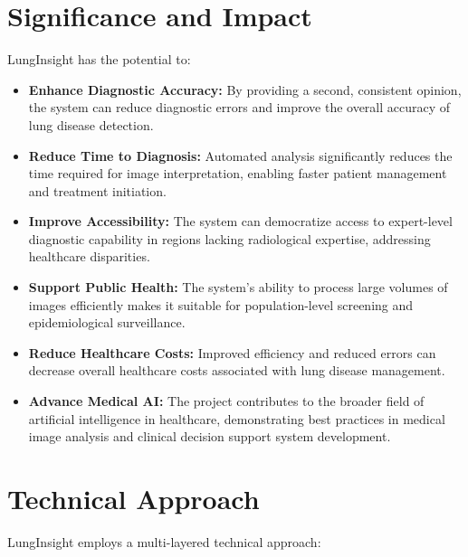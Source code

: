 {\section{Significance and Impact}

LungInsight has the potential to:

\begin{itemize}
    \item \textbf{Enhance Diagnostic Accuracy:} By providing a second, consistent opinion, the system can reduce diagnostic errors and improve the overall accuracy of lung disease detection.
    \item \textbf{Reduce Time to Diagnosis:} Automated analysis significantly reduces the time required for image interpretation, enabling faster patient management and treatment initiation.
    \item \textbf{Improve Accessibility:} The system can democratize access to expert-level diagnostic capability in regions lacking radiological expertise, addressing healthcare disparities.
    \item \textbf{Support Public Health:} The system's ability to process large volumes of images efficiently makes it suitable for population-level screening and epidemiological surveillance.
    \item \textbf{Reduce Healthcare Costs:} Improved efficiency and reduced errors can decrease overall healthcare costs associated with lung disease management.
    \item \textbf{Advance Medical AI:} The project contributes to the broader field of artificial intelligence in healthcare, demonstrating best practices in medical image analysis and clinical decision support system development.
\end{itemize}

\section{Technical Approach}

LungInsight employs a multi-layered technical approach:

}

